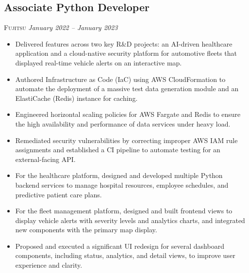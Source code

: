 \documentclass[10pt, a4paper]{article} %
\begin{document}
\subsection*{Associate Python Developer}
\textsc{Fujitsu} \textit{January 2022 – January 2023}
\begin{itemize}
    \itemsep -0.5em %
    \item Delivered features across two key R\&D projects: an AI-driven healthcare application and a cloud-native security platform for automotive fleets that displayed real-time vehicle alerts on an interactive map.
    \item Authored Infrastructure as Code (IaC) using AWS CloudFormation to automate the deployment of a massive test data generation module and an ElastiCache (Redis) instance for caching.
    \item Engineered horizontal scaling policies for AWS Fargate and Redis to ensure the high availability and performance of data services under heavy load.
    \item Remediated security vulnerabilities by correcting improper AWS IAM rule assignments and established a CI pipeline to automate testing for an external-facing API.
    \item For the healthcare platform, designed and developed multiple Python backend services to manage hospital resources, employee schedules, and predictive patient care plans.
    \item For the fleet management platform, designed and built frontend views to display vehicle alerts with severity levels and analytics charts, and integrated new components with the primary map display.
    \item Proposed and executed a significant UI redesign for several dashboard components, including status, analytics, and detail views, to improve user experience and clarity.
\end{itemize}
\end{document}
